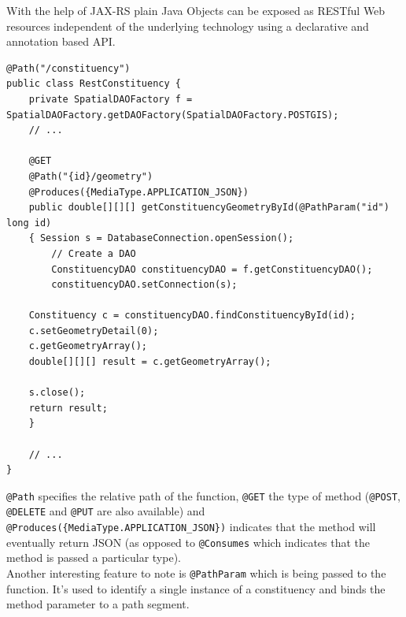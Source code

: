 With the help of JAX-RS plain Java Objects can be exposed as RESTful Web
resources independent of the underlying technology using a declarative
and annotation based API.

\begin{lstlisting}
@Path("/constituency")
public class RestConstituency {
    private SpatialDAOFactory f = SpatialDAOFactory.getDAOFactory(SpatialDAOFactory.POSTGIS);
	// ...
	
    @GET
    @Path("{id}/geometry")
    @Produces({MediaType.APPLICATION_JSON})
    public double[][][] getConstituencyGeometryById(@PathParam("id") long id)
    { Session s = DatabaseConnection.openSession();
        // Create a DAO
        ConstituencyDAO constituencyDAO = f.getConstituencyDAO();
        constituencyDAO.setConnection(s);

	Constituency c = constituencyDAO.findConstituencyById(id);
	c.setGeometryDetail(0);
	c.getGeometryArray();
	double[][][] result = c.getGeometryArray();
		
	s.close();
	return result;
    }
    
	// ...
}
\end{lstlisting}

\texttt{@Path} specifies the relative path of the function,
\texttt{@GET} the type of method (\texttt{@POST}, \texttt{@DELETE} and
\texttt{@PUT} are also available) and
\texttt{@Produces(\{MediaType.APPLICATION\_JSON\})} indicates that the
method will eventually return JSON (as opposed to \texttt{@Consumes}
which indicates that the method is passed a particular type).\\Another
interesting feature to note is \texttt{@PathParam} which is being passed
to the function. It's used to identify a single instance of a
constituency and binds the method parameter to a path segment.